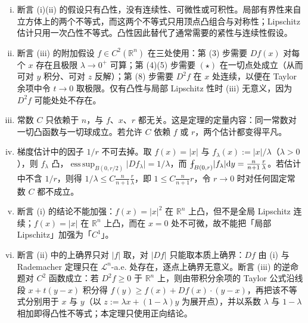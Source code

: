 \documentclass[../../main.tex]{subfiles}%
\begin{document}
\begin{remark}\label{remark:ch06-thm-6-7-条件}
\begin{enumerate}[(i)]
\item 断言 (i)(ii) 的假设只有凸性，没有连续性、可微性或可积性。局部有界性来自立方体上的两个不等式，而这两个不等式只用顶点凸组合与对称性；Lipschitz 估计只用一次凸性不等式。凸性因此替代了通常需要的紧性与连续性假设。
\item 断言 (iii) 的附加假设 $f\in C^{2}(\mathbb{R}^n)$ 在三处使用：第 (3) 步需要 $Df(x)$ 对每个 $x$ 存在且极限 $\lambda\to0^{+}$ 可算；第 (4)(5) 步需要 $(\star)$ 在一切点处成立（从而可对 $y$ 积分、可对 $z$ 反解）；第 (8) 步需要 $D^{2}f$ 在 $x$ 处连续，以便在 Taylor 余项中令 $t\to0$ 取极限。仅有凸性与局部 Lipschitz 性时 (iii) 无意义，因为 $D^{2}f$ 可能处处不存在。
\item 常数 $C$ 只依赖于 $n$，与 $f$、$x$、$r$ 都无关。这是定理的定量内容：同一常数对一切凸函数与一切球成立。若允许 $C$ 依赖 $f$ 或 $r$，两个估计都变得平凡。
\item 梯度估计中的因子 $1/r$ 不可去掉。取 $f(x)=\lvert x\rvert$ 与 $f_{\lambda}(x):=\lvert x\rvert/\lambda$（$\lambda>0$），则 $f_{\lambda}$ 凸，$\operatorname{ess\,sup}_{B(0,r/2)}\lvert Df_{\lambda}\rvert=1/\lambda$，而 $\fint_{B(0,r)}\lvert f_{\lambda}\rvert\diff y=\frac{n}{n+1}\frac r\lambda$。若估计中不含 $1/r$，则得 $1/\lambda\leqslant C\frac{n}{n+1}\frac r\lambda$，即 $1\leqslant C\frac{n}{n+1}r$，令 $r\to0$ 时对任何固定常数 $C$ 都不成立。
\item 断言 (i) 的结论不能加强：$f(x)=\lvert x\rvert^{2}$ 在 $\mathbb{R}^n$ 上凸，但不是全局 Lipschitz 连续；$f(x)=\lvert x\rvert$ 在 $\mathbb{R}^n$ 上凸，而在 $x=0$ 处不可微，故不能把「局部 Lipschitz」加强为「$C^{1}$」。
\item 断言 (ii) 中的上确界只对 $\lvert f\rvert$ 取，对 $\lvert Df\rvert$ 只能取本质上确界：$Df$ 由 (i) 与 Rademacher 定理只在 $\mathcal{L}^{n}$-a.e. 处存在，逐点上确界无意义。断言 (iii) 的逆命题对 $C^{2}$ 函数成立：若 $D^{2}f\geqslant0$ 于 $\mathbb{R}^n$ 上，则由带积分余项的 Taylor 公式沿线段 $x+t(y-x)$ 积分得 $f(y)\geqslant f(x)+Df(x)\cdot(y-x)$，再把该不等式分别用于 $x$ 与 $y$（以 $z:=\lambda x+(1-\lambda)y$ 为展开点），并以系数 $\lambda$ 与 $1-\lambda$ 相加即得凸性不等式；本定理只使用正向结论。
\end{enumerate}
\end{remark}
\end{document}
